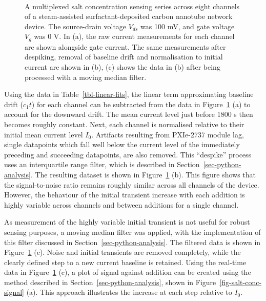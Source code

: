 \documentclass[
  a4paper,
]{scrbook}
\begin{document}
\begin{figure}
\begin{minipage}[t]{0.70\linewidth}
{{}

}

\end{minipage}%
%
\begin{minipage}[t]{0.15\linewidth}

{\centering 

~

}

\end{minipage}%

\caption[Salt concentration sensing series across eight device channels,
shown alongside the same dataset after the use of various filtering
approaches.]{\label{fig-salt-conc-sensing}A multiplexed salt
concentration sensing series across eight channels of a steam-assisted
surfactant-deposited carbon nanotube network device. The source-drain
voltage \(V_{ds}\) was 100 mV, and gate voltage \(V_g\) was 0 V. In (a),
the raw current measurements for each channel are shown alongside gate
current. The same measurements after despiking, removal of baseline
drift and normalisation to initial current are shown in (b), (c) shows
the data in (b) after being processed with a moving median filter.}

\end{figure}

Using the data in Table~\ref{tbl-linear-fits}, the linear term
approximating baseline drift (\(c_1t\)) for each channel can be
subtracted from the data in Figure~\ref{fig-salt-conc-sensing} (a) to
account for the downward drift. The mean current level just before 1800
s then becomes roughly constant. Next, each channel is normalised
relative to their initial mean current level \(I_{0}\). Artifacts
resulting from PXIe-2737 module lag, single datapoints which fall well
below the current level of the immediately preceding and succeeding
datapoints, are also removed. This ``despike'' process uses an
interquartile range filter, which is described in
Section~\ref{sec-python-analysis}. The resulting dataset is shown in
Figure~\ref{fig-salt-conc-sensing} (b). This figure shows that the
signal-to-noise ratio remains roughly similar across all channels of the
device. However, the behaviour of the initial transient increase with
each addition is highly variable across channels and between additions
for a single channel.

As measurement of the highly variable initial transient is not useful
for robust sensing purposes, a moving median filter was applied, with
the implementation of this filter discussed in
Section~\ref{sec-python-analysis}. The filtered data is shown in
Figure~\ref{fig-salt-conc-sensing} (c). Noise and initial transients are
removed completely, while the clearly defined step to a new current
baseline is retained. Using the real-time data in
Figure~\ref{fig-salt-conc-sensing} (c), a plot of signal against
addition can be created using the method described in
Section~\ref{sec-python-analysis}, shown in
Figure~\ref{fig-salt-conc-signal} (a). This approach illustrates the
increase at each step relative to \(I_{0}\).
\end{document}
